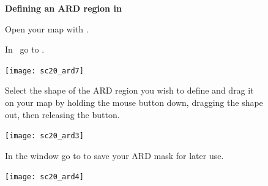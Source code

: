\documentclass[11pt,oneside,chapters]{starlink}
\begin{document}
\begin{figure}[ht!]
\begin{center}
\begin{fmpage}{0.99\linewidth}
\vspace{0.2cm}
\hspace{0.2cm}
\textbf{Defining an ARD region in \gaia}

\vspace{0.5cm}
\hspace{0.1cm}
\begin{minipage}[c]{0.23\linewidth}
Open your map with \gaia.
\end{minipage}
\hspace{0.2cm}
\begin{minipage}[c]{0.72\linewidth}
\begin{terminalv}
\end{terminalv}
\end{minipage}

\begin{minipage}[c]{1.0\linewidth}
\end{minipage}

\vspace{0.5cm}
\hspace{0.1cm}
\begin{minipage}[c]{0.23\linewidth}
In \gaia\ go to .
\end{minipage}
\hspace{0.2cm}
\begin{minipage}[c]{0.72\linewidth}
\centering
\texttt{[image: sc20\_ard7]}
\end{minipage}

\vspace{0.5cm}

\hspace{0.1cm}
\begin{minipage}[c]{0.23\linewidth}
Select the shape of the ARD region you wish to define and drag it on
your map by holding the mouse button down, dragging the shape out,
then releasing the button.
\end{minipage}
\hspace{0.2cm}
\begin{minipage}[c]{0.72\linewidth}
\centering
\texttt{[image: sc20\_ard3]}
\vspace{0.2cm}
\end{minipage}

\vspace{0.5cm}


\hspace{0.1cm}
\begin{minipage}[c]{0.23\linewidth}
In the  window go to  to save your ARD mask for later use.
\end{minipage}
\hspace{0.2cm}
\begin{minipage}[c]{0.72\linewidth}
\centering
\texttt{[image: sc20\_ard4]}
\vspace{0.2cm}
\end{minipage}


\end{fmpage}
\end{center}
\end{figure}
\end{document}
